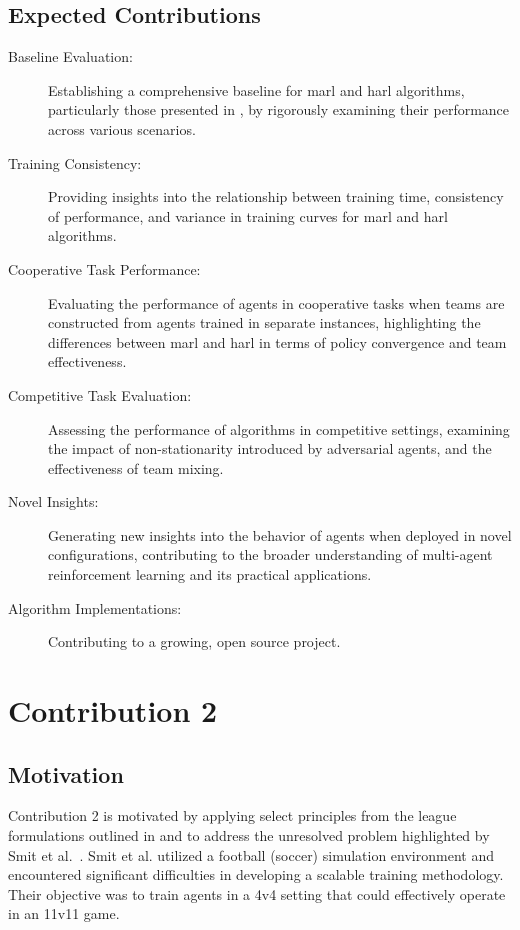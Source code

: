\subsection{Expected Contributions}
\begin{description}
    \item[Baseline Evaluation:] 
    Establishing a comprehensive baseline for \gls{marl} and \gls{harl} algorithms, 
    particularly those presented in \cite{zhong2024}, by rigorously examining their 
    performance across various scenarios.
    \item[Training Consistency:] 
    Providing insights into the relationship between training time, consistency of performance, 
    and variance in training curves for \gls{marl} and \gls{harl} algorithms.
    \item[Cooperative Task Performance:] 
    Evaluating the performance of agents in cooperative tasks when teams are constructed from 
    agents trained in separate instances, highlighting the differences between 
    \gls{marl} and \gls{harl} in terms of policy convergence and team effectiveness.
    \item[Competitive Task Evaluation:] 
    Assessing the performance of algorithms in competitive settings, examining the impact of 
    non-stationarity introduced by adversarial agents, and the effectiveness of team mixing.
    \item[Novel Insights:] 
    Generating new insights into the behavior of agents when deployed in novel configurations, 
    contributing to the broader understanding of multi-agent reinforcement 
    learning and its practical applications.
    \item[Algorithm Implementations:] 
    Contributing to a growing, open source project.
\end{description}



\section{Contribution 2}

\subsection{Motivation}
Contribution 2 is motivated by applying select principles from the league formulations outlined 
in \cite{vinyals2019} and \cite{berner2019} to address the unresolved problem highlighted by 
Smit et al.~\cite{smit2023}. Smit et al. utilized a football (soccer) simulation environment and 
encountered significant difficulties in developing a scalable training methodology. Their 
objective was to train agents in a 4v4 setting that could effectively operate in an 11v11 game.


